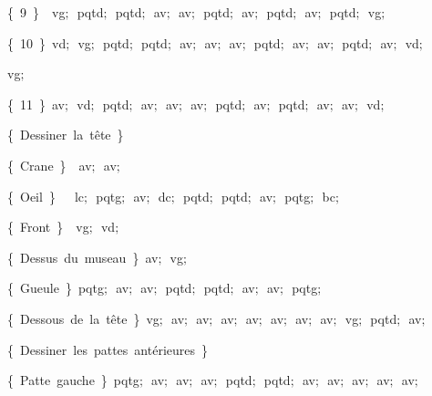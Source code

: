 {\vspace{\neglskip}\mbox{\blc  \blk\blk\idt  \cmt  \{\ 9\ \}\idt \ \ vg$;$\ pqtd$;$\ pqtd$;$\ av$;$\ av$;$\ pqtd$;$\ av$;$\ pqtd$;$\ av$;$\ pqtd$;$\ vg$;$\ }\par 
\vspace{\neglskip}\mbox{\blc  \blk\blk\idt  \cmt  \{\ 10\ \}\idt \ vd$;$\ vg$;$\ pqtd$;$\ pqtd$;$\ av$;$\ av$;$\ av$;$\ pqtd$;$\ av$;$\ av$;$\ pqtd$;$\ av$;$\ vd$;$}\par 
\vspace{\neglskip}\mbox{\blc  \blk\blk\blk\blk\blk\blk\blk\blk\blk\idt  vg$;$\ }\par 
\vspace{\neglskip}\mbox{\blc  \blk\blk\idt  \cmt  \{\ 11\ \}\idt \ av$;$\ vd$;$\ pqtd$;$\ av$;$\ av$;$\ av$;$\ pqtd$;$\ av$;$\ pqtd$;$\ av$;$\ av$;$\ vd$;$}\par 
\vspace{\neglskip}\mbox{\blc  \blk\idt  \cmt  \{\ Dessiner\ la\ tête\ \}\idt }\par 
\vspace{\neglskip}\mbox{\blc  \blk\blk\idt  \cmt  \{\ Crane\ \}\idt \ \ av$;$\ av$;$}\par 
\vspace{\neglskip}\mbox{\blc  \blk\blk\idt  \cmt  \{\ Oeil\ \}\idt \ \ \ lc$;$\ pqtg$;$\ av$;$\ dc$;$\ pqtd$;$\ pqtd$;$\ av$;$\ pqtg$;$\ bc$;$}\par 
\vspace{\neglskip}\mbox{\blc  \blk\blk\idt  \cmt  \{\ Front\ \}\idt \ \ vg$;$\ vd$;$\ }\par 
\vspace{\neglskip}\mbox{\blc  \blk\blk\idt  \cmt  \{\ Dessus\ du\ museau\ \}\idt \ av$;$\ vg$;$}\par 
\vspace{\neglskip}\mbox{\blc  \blk\blk\idt  \cmt  \{\ Gueule\ \}\idt \ pqtg$;$\ av$;$\ av$;$\ pqtd$;$\ pqtd$;$\ av$;$\ av$;$\ pqtg$;$}\par 
\vspace{\neglskip}\mbox{\blc  \blk\blk\idt  \cmt  \{\ Dessous\ de\ la\ tête\ \}\idt \ vg$;$\ av$;$\ av$;$\ av$;$\ av$;$\ av$;$\ av$;$\ av$;$\ vg$;$\ pqtd$;$\ av$;$}\par 
\vspace{\neglskip}\mbox{\blc  \blk\idt  \cmt  \{\ Dessiner\ les\ pattes\ antérieures\ \}\idt }\par 
\vspace{\neglskip}\mbox{\blc  \blk\blk\idt  \cmt  \{\ Patte\ gauche\ \}\idt \ pqtg$;$\ av$;$\ av$;$\ av$;$\ pqtd$;$\ pqtd$;$\ av$;$\ av$;$\ av$;$\ av$;$\ av$;$\ }\par 
}
